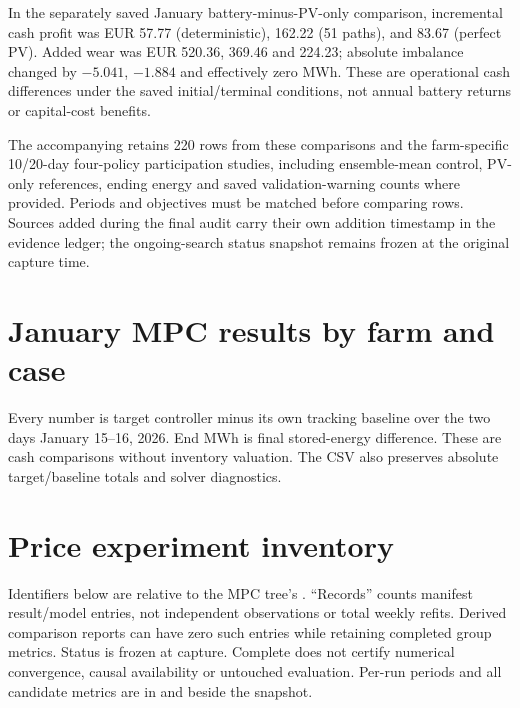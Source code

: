 In the separately saved January battery-minus-PV-only comparison, incremental
cash profit was EUR 57.77 (deterministic), 162.22 (51 paths), and 83.67 (perfect
PV). Added wear was EUR 520.36, 369.46 and 224.23; absolute imbalance changed
by $-5.041$, $-1.884$ and effectively zero MWh. These are operational cash
differences under the saved initial/terminal conditions, not annual battery
returns or capital-cost benefits.

The accompanying  retains 220 rows from these
comparisons and the farm-specific 10/20-day four-policy participation studies,
including ensemble-mean control, PV-only references, ending energy and saved
validation-warning counts where provided. Periods and objectives must be
matched before comparing rows. Sources added during the final audit carry
their own addition timestamp in the evidence ledger; the ongoing-search status
snapshot remains frozen at the original capture time.

\section{January MPC results by farm and case}
\label{app:mpc-farms}
Every number is target controller minus its own tracking baseline over the two
days January 15--16, 2026. End MWh is final stored-energy difference. These
are cash comparisons without inventory valuation. The CSV also preserves
absolute target/baseline totals and solver diagnostics.


\section{Price experiment inventory}
\label{app:price-inventory}
Identifiers below are relative to the MPC tree's
. ``Records'' counts manifest result/model
entries, not independent observations or total weekly refits. Derived comparison
reports can have zero such entries while retaining completed group metrics.
Status is frozen at capture. Complete does not certify numerical convergence,
causal availability or untouched evaluation. Per-run periods and all candidate
metrics are in  and
 beside the snapshot.


